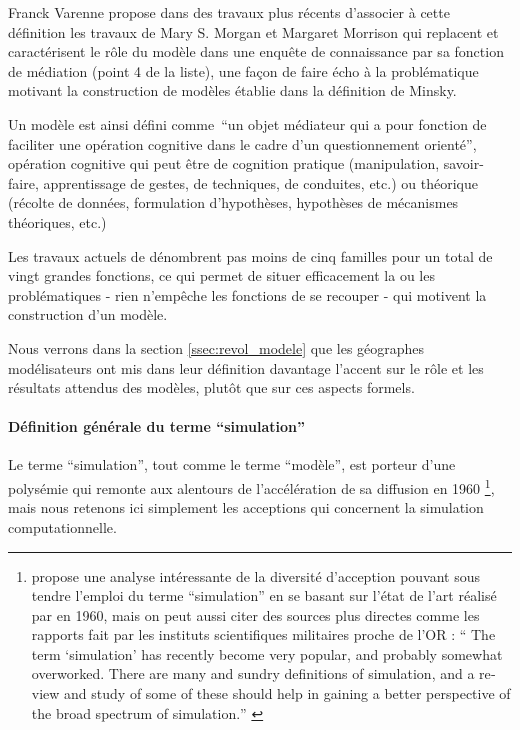 Franck Varenne propose dans des travaux plus récents \autocite{Varenne2013} d'associer à cette définition les travaux de Mary S. Morgan et Margaret Morrison qui replacent et caractérisent le rôle du modèle dans une enquête de connaissance par sa fonction de médiation (point 4 de la liste), une façon de faire écho à la problématique motivant la construction de modèles établie dans la définition de Minsky.

Un modèle est ainsi défini comme \enquote{un objet médiateur qui a pour fonction de faciliter une opération cognitive dans le cadre d'un questionnement orienté}, opération cognitive qui peut être de cognition pratique (manipulation, savoir-faire, apprentissage de gestes, de techniques, de conduites, etc.) ou théorique (récolte de données, formulation d'hypothèses, hypothèses de mécanismes théoriques, etc.) \autocite{Varenne2013}

Les travaux actuels de \textcite{Varenne2008, Varenne2013} dénombrent pas moins de cinq familles pour un total de vingt grandes fonctions, ce qui permet de situer efficacement la ou les problématiques - rien n’empêche les fonctions de se recouper - qui motivent la construction d'un modèle. 

Nous verrons dans la section \ref{ssec:revol_modele} que les géographes modélisateurs ont mis dans leur définition davantage l'accent sur le rôle et les résultats attendus des modèles, plutôt que sur ces aspects formels.

\paragraph{Définition générale du terme \enquote{simulation}}

Le terme \enquote{simulation}, tout comme le terme \enquote{modèle}, est porteur d'une polysémie qui remonte aux alentours de l'accélération de sa diffusion en 1960 \footnote{ \textcite[343-350]{Morgan2004} propose une analyse intéressante de la diversité d’acception pouvant sous tendre l'emploi du terme \enquote{simulation} en se basant sur l'état de l'art réalisé par \textcite{Shubik1960a} en 1960, mais on peut aussi citer des sources plus directes comme les rapports fait par les instituts scientifiques militaires proche de l'OR : \foreignquote{english}{ The term \enquote{simulation} has recently become very popular, and probably somewhat overworked. There are many and sundry definitions of simulation, and a review and study of some of these should help in gaining a better perspective of the broad spectrum of simulation.} \autocite{Harman1961}}, mais nous retenons ici simplement les acceptions qui concernent la simulation computationnelle.

